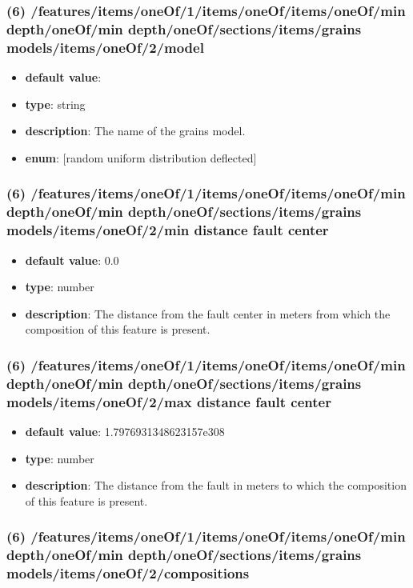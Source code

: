 \subsubsection{(6) /features/items/oneOf/1/items/oneOf/items/oneOf/min depth/oneOf/min depth/oneOf/sections/items/grains models/items/oneOf/2/model}
\begin{itemize}[leftmargin=6em]\item {\bf default value}: 
\item {\bf type}: string
\item {\bf description}: The name of the grains model.
\item {\bf enum}: [random uniform distribution deflected]\end{itemize}\subsubsection{(6) /features/items/oneOf/1/items/oneOf/items/oneOf/min depth/oneOf/min depth/oneOf/sections/items/grains models/items/oneOf/2/min distance fault center}
\begin{itemize}[leftmargin=6em]\item {\bf default value}: 0.0
\item {\bf type}: number
\item {\bf description}: The distance from the fault center in meters from which the composition of this feature is present.
\end{itemize}\subsubsection{(6) /features/items/oneOf/1/items/oneOf/items/oneOf/min depth/oneOf/min depth/oneOf/sections/items/grains models/items/oneOf/2/max distance fault center}
\begin{itemize}[leftmargin=6em]\item {\bf default value}: 1.7976931348623157e308
\item {\bf type}: number
\item {\bf description}: The distance from the fault in meters to which the composition of this feature is present.
\end{itemize}\subsubsection{(6) /features/items/oneOf/1/items/oneOf/items/oneOf/min depth/oneOf/min depth/oneOf/sections/items/grains models/items/oneOf/2/compositions}
